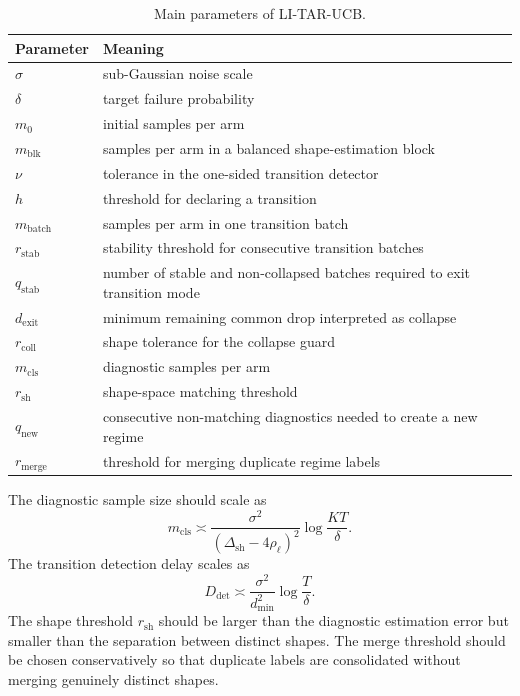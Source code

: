 \documentclass[11pt]{article}
\begin{document}
\begin{table}[h]
\centering
\begin{tabular}{ll}
\toprule
Parameter & Meaning \\
\midrule
$\sigma$ & sub-Gaussian noise scale \\
$\delta$ & target failure probability \\
$m_0$ & initial samples per arm \\
$m_{\mathrm{blk}}$ & samples per arm in a balanced shape-estimation block \\
$\nu$ & tolerance in the one-sided transition detector \\
$h$ & threshold for declaring a transition \\
$m_{\mathrm{batch}}$ & samples per arm in one transition batch \\
$r_{\mathrm{stab}}$ & stability threshold for consecutive transition batches \\
$q_{\mathrm{stab}}$ & number of stable and non-collapsed batches required to exit transition mode \\
$d_{\mathrm{exit}}$ & minimum remaining common drop interpreted as collapse \\
$r_{\mathrm{coll}}$ & shape tolerance for the collapse guard \\
$m_{\mathrm{cls}}$ & diagnostic samples per arm \\
$r_{\mathrm{sh}}$ & shape-space matching threshold \\
$q_{\mathrm{new}}$ & consecutive non-matching diagnostics needed to create a new regime \\
$r_{\mathrm{merge}}$ & threshold for merging duplicate regime labels \\
\bottomrule
\end{tabular}
\caption{Main parameters of LI-TAR-UCB.}
\label{tab:parameters}
\end{table}

The diagnostic sample size should scale as
\begin{equation}
\label{eq:practical_m_cls}
m_{\mathrm{cls}}
\asymp
\frac{\sigma^2}{(\Delta_{\mathrm{sh}}-4\rho_{\ell})^2}
\log\frac{KT}{\delta}.
\end{equation}
The transition detection delay scales as
\begin{equation}
\label{eq:practical_d_det}
D_{\mathrm{det}}
\asymp
\frac{\sigma^2}{d_{\min}^2}
\log\frac{T}{\delta}.
\end{equation}
The shape threshold $r_{\mathrm{sh}}$ should be larger than the diagnostic estimation error but smaller than the separation between distinct shapes. The merge threshold should be chosen conservatively so that duplicate labels are consolidated without merging genuinely distinct shapes.
\end{document}
